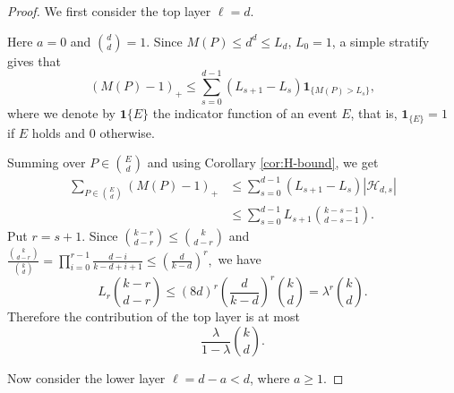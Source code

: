 \documentclass[11pt]{article}
\numberwithin{equation}{section}
\begin{document}
	\begin{proof}
		We first consider the top layer $\ell=d$. 

 Here $a=0$ and $\binom{d}{d}=1$.  Since $M(P)\le d^d\le L_d$, $L_0=1$, a simple stratify gives that
		\[
		(M(P)-1)_+
		\le
		\sum_{s=0}^{d-1}(L_{s+1}-L_s)\mathbf 1_{\{M(P)>L_s\}},
		\]
		where we denote by $\mathbf{1}\{E\}$ the indicator function of an event $E$,
		that is, $\mathbf{1}_{\{E\}} = 1$ if $E$ holds and $0$ otherwise.
		
		Summing over $P\in\binom{E}{d}$ and using Corollary \ref{cor:H-bound}, we get
		\[
		\begin{aligned}
			\sum_{P\in\binom{E}{d}}(M(P)-1)_+
			&\le
			\sum_{s=0}^{d-1}(L_{s+1}-L_s)|\mathcal H_{d,s}|  \\
			&\le
			\sum_{s=0}^{d-1}L_{s+1}\binom{k-s-1}{d-s-1}.
		\end{aligned}
		\]
		Put $r=s+1$.  Since
		$
		\binom{k-r}{d-r}\le \binom{k}{d-r}
		$
		and
		$
		\frac{\binom{k}{d-r}}{\binom{k}{d}}=\prod\limits_{i=0}^{r-1}\frac{d-i}{k-d+i+1}
		\le
		\left(\frac{d}{k-d}\right)^r,
		$
		we have
		\begin{equation}\label{eq:binom-estimate}
		L_r\binom{k-r}{d-r}
		\le
		(8d)^r\left(\frac{d}{k-d}\right)^r\binom{k}{d}
		=
		\lambda^r\binom{k}{d}.
		\end{equation}
		Therefore the contribution of the top layer is at most
		\begin{equation}\label{eq:top-layer}
			\frac{\lambda}{1-\lambda}\binom{k}{d}.
		\end{equation}
		
		Now consider the lower layer $\ell=d-a<d$, where $a\ge 1$.


\end{proof}
\end{document}
